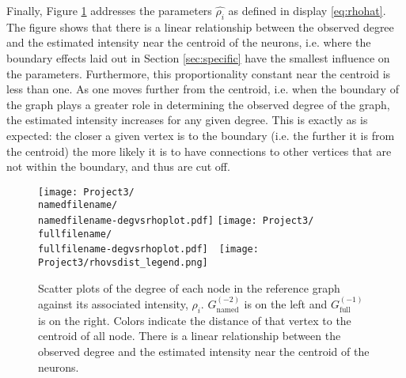 \documentclass[11]{article}
\newcommand{\namedfilename}{namedminus2-2p}
\newcommand{\fullfilename}{fullminus1-2p}
\def\bas #1\eas{\begin{align*} #1 \end{align*}}
\newcommand{\varep}{\varepsilon}
\newcommand{\namedtwo}{G_{\textrm{named}}^{(-2)}}
\newcommand{\fullone}{G_{\textrm{full}}^{(-1)}}
\theoremstyle{remark}
\theoremstyle{definition}
\begin{document}
Finally, Figure \ref{fig:rhodegscatter} addresses the parameters $\hat{\rho_i}$ as defined in display \eqref{eq:rhohat}. The figure shows that there is a linear relationship between the observed degree and the estimated intensity near the centroid of the neurons,  i.e. where the boundary effects laid out in Section \ref{sec:specific} have the smallest influence on the parameters. Furthermore, this proportionality constant near the centroid is less than one. As one moves further from the centroid, i.e. when the boundary of the graph plays a greater role in determining the observed degree of the graph, the estimated intensity increases for any given degree. This is exactly as is expected: the closer a given vertex is to the boundary (i.e. the further it is from the centroid) the more likely it is to have connections to other vertices that are not within the boundary, and thus are cut off. 

\begin{figure}
    \centering
         \texttt{[image: Project3/\\namedfilename/\\namedfilename-degvsrhoplot.pdf]}
     \quad \texttt{[image: Project3/\\fullfilename/\\fullfilename-degvsrhoplot.pdf]}~~\texttt{[image: Project3/rhovsdist\_legend.png]}
    
     \caption{Scatter plots of the degree of each node in the reference graph against its associated intensity, $\rho_i$. $\namedtwo$ is on the left and $\fullone$ is on the right. Colors indicate the distance of that vertex to the centroid of all node. There is a linear relationship between the observed degree and the estimated intensity near the centroid of the neurons.}

    \label{fig:rhodegscatter}
\end{figure}


\end{document}
